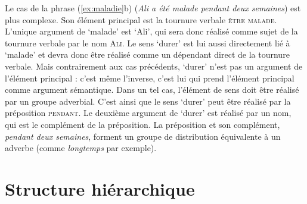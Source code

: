 Le cas de la phrase (\ref{ex:maladie}b) (\textit{Ali a été malade pendant deux semaines}) est plus complexe. Son élément principal est la tournure verbale \textsc{être} \textsc{malade}. L’unique argument de ‘malade’ est ‘Ali’, qui sera donc réalisé comme sujet de la tournure verbale par le nom \textsc{Ali}. Le sens ‘durer’ est lui aussi directement lié à ‘malade’ et devra donc être réalisé comme un dépendant direct de la tournure verbale. Mais contrairement aux cas précédents, ‘durer’ n’est pas un argument de l’élément principal : c’est même l’inverse, c’est lui qui prend l’élément principal comme argument sémantique. Dans un tel cas, l’élément de sens doit être réalisé par un groupe adverbial. C’est ainsi que le sens ‘durer’ peut être réalisé par la préposition \textsc{pendant}. Le deuxième argument de ‘durer’ est réalisé par un nom, qui est le complément de la préposition. La préposition et son complément, \textit{pendant deux semaines}, forment un groupe de distribution équivalente à un adverbe (comme \textit{longtemps} par exemple).

\section{Structure hiérarchique}\label{sec:1.2.9}

